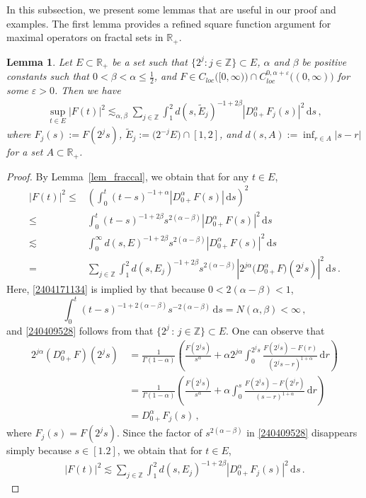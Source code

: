 \documentclass[11pt]{amsart}
\theoremstyle{plain}
\newtheorem{lemma}[theorem]{Lemma}
\theoremstyle{definition}
\theoremstyle{remark}
\numberwithin{equation}{section}
\newcommand{\bR}{\mathbb{R}}
\newcommand{\bZ}{\mathbb{Z}}
\newcommand{\dd}{\,\mathrm{d}}
\begin{document}
In this subsection, we present some lemmas that are useful in our proof and examples.
The first lemma provides a refined square function argument for maximal operators on fractal sets in $\bR_+$.
\begin{lemma}\label{lem_sqrftn}
Let $E\subset\bR_+$ be a set such that $\{2^j:j\in\bZ\}\subset E$, $\alpha$ and $\beta$ be positive constants such that $0<\beta<\alpha\leq \frac{1}{2}$, and $F\in C_{loc}\big([0,\infty)\big)\cap C^{0,\alpha+\varepsilon}_{loc}\big((0,\infty)\big)$ for some $\varepsilon>0$.
Then we have
    \begin{align*}
        \sup_{t\in E}|F(t)|^2\lesssim_{\alpha,\beta} \sum_{j\in\bZ}\int_1^2 d(s,\widetilde{E}_j)^{-1+2\beta}|D^\alpha_{0+}F_j(s)|^2\dd s\,,
    \end{align*}
    where $F_j(s):=F(2^js)$, $\widetilde{E}_j:=\big(2^{-j}E\big)\cap [1,2]$, and $d(s,A):=\inf_{r\in A}|s-r|$ for a set $A\subset \bR_+$.
\end{lemma}

\begin{proof}
By Lemma~\ref{lem_fraccal}, we obtain that for any $t\in E$,
\begin{align}
|F(t)|^2\leq &\left(\int_0^t(t-s)^{-1+\alpha}\left|D^\alpha_{0+}F(s)\right|\dd s\right)^2\nonumber\\
\leq &\int_0^t(t-s)^{-1+2\beta}s^{2(\alpha-\beta)}\left|D^\alpha_{0+}F(s)\right|^2\dd s\label{2404171134}\\
\lesssim &\int_0^\infty d(s,E)^{-1+2\beta}s^{2(\alpha-\beta)}\left|D^\alpha_{0+}F(s)\right|^2\dd s\nonumber\\%
= &\sum_{j\in\bZ}\int_1^2 d(s,E_j)^{-1+2\beta}s^{2
(\alpha-\beta)}\left|2^{j\alpha}\big(D^\alpha_{0+}F\big)(2^js)\right|^2\dd s\,.\label{240409528}
\end{align}
Here, \eqref{2404171134} is implied by that because $0<2(\alpha-\beta)<1$,
$$
\int_0^t(t-s)^{-1+2(\alpha-\beta)}s^{-2(\alpha-\beta)}\dd s=N(\alpha,\beta)<\infty\,,
$$
and \eqref{240409528} follows from that $\{2^j\,:\,j\in\bZ\}\subset E$.
One can observe that
\begin{align*}
2^{j\alpha}\left(D_{0+}^\alpha F\right)(2^js)\,&=\frac{1}{\Gamma(1-\alpha)}\left(\frac{F(2^js)}{s^{\alpha}}+\alpha2^{j\alpha}\int_0^{2^js}\frac{F(2^js)-F(r)}{(2^js-r)^{1+\alpha}}\dd r\right)\\
&=\frac{1}{\Gamma(1-\alpha)}\left(\frac{F(2^js)}{s^{\alpha}}+\alpha\int_0^s\frac{F(2^js)-F(2^jr)}{(s-r)^{1+\alpha}}\dd r\right)\\
&=D_{0+}^\alpha F_j(s)\,,
\end{align*}
where $F_j(s)=F(2^js)$.
Since the factor of $s^{2(\alpha-\beta)}$ in \eqref{240409528} disappears simply because $s\in[1.2]$, we obtain that for $t\in E$,
\begin{align*}
|F(t)|^2\lesssim \sum_{j\in\bZ}\int_1^2 d(s,E_j)^{-1+2\beta}\left|D^\alpha_{0+}F_j(s)\right|^2\dd s\,.
\end{align*}
\end{proof}
\end{document}

